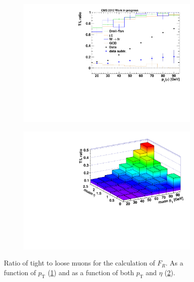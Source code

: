 \begin{figure}
  \centering
  \begin{subfigure}[b]{0.495\textwidth}
    \centering
    \includegraphics[width=\textwidth]{plots/tlratio.pdf}
    \caption{\label{fig:tlratio}}
  \end{subfigure}
  \begin{subfigure}[b]{0.495\textwidth}
    \centering
    \includegraphics[width=\textwidth]{plots/tlratio2d.pdf}
    \caption{\label{fig:tlratio2d}}
  \end{subfigure}

  \caption{Ratio of tight to loose muons for the calculation of $F_R$. As a function of $p_{\text{T}}$ (\ref{fig:tlratio}) and as a function of both $p_{\text{T}}$ and $\eta$ (\ref{fig:tlratio2d}).}
  \label{fig:tlratios}
\end{figure}

